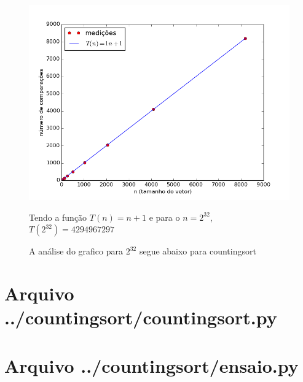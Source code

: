 \documentclass[12pt,a4paper,twoside]{report}
\begin{document}
\begin{figure}[ht]
\centering \includegraphics[scale=0.8]{../countingsort/imagens/countingsortQuaseDecresc501.png}
\caption{A análise do grafico para $2^{32}$ segue abaixo para countingsort}

Tendo a função $T(n) = n+1$ e para o $n =2^{32}$, $T(2^{32}) = 4294967297$ 
\label{fig:countingsortQuaseDecresc501}
\end{figure}


\clearpage
\clearpage
{}
\appendix

\chapter{Arquivo ../countingsort/countingsort.py \label{ap:countingsort}}


\chapter{Arquivo ../countingsort/ensaio.py \label{ap:countingsortensaio}}

\end{document}
